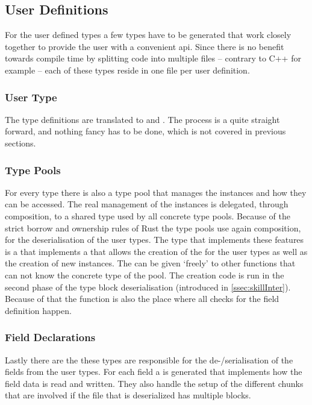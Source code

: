 \documentclass[thesis]{subfiles}
\begin{document}
  \subsection{User Definitions}
    For the user defined types a few types have to be generated that work closely together to provide the user with a convenient \gls{api}.
    Since there is no benefit towards compile time by splitting code into multiple files -- contrary to C++ for example -- each of these types reside in one file per user definition.

    \subsubsection{User Type}
      The type definitions are translated to \structs and \traits.
      The process is a quite straight forward, and nothing fancy has to be done, which is not covered in previous sections.

    \subsubsection{Type Pools}
      For every type there is also a type pool that manages the instances and how they can be accessed.
      The real management of the instances is delegated, through composition, to a shared type used by all concrete type pools.
      Because of the strict borrow and ownership rules of Rust the type pools use again composition, for the deserialisation of the user types.
      The type that implements these features is a  that implements a \trait that allows the creation of the \FieldDefinitions for the user types as well as the creation of new instances.
      The \trait can be given `freely' to other functions that can not know the concrete type of the pool.
      The \FieldDefinition creation code is run in the second phase of the type block deserialisation (introduced in \autoref{ssec:skillInter}).
      Because of that the  function is also the place where all checks for the field definition happen.

    \subsubsection{Field Declarations}
      Lastly there are the \FieldDefinitions these types are responsible for the de-/serialisation of the fields from the user types.
      For each field a \FieldDefinition is generated that implements how the field data is read and written.
      They also handle the setup of the different chunks that are involved if the file that is deserialized has multiple blocks.
\end{document}
